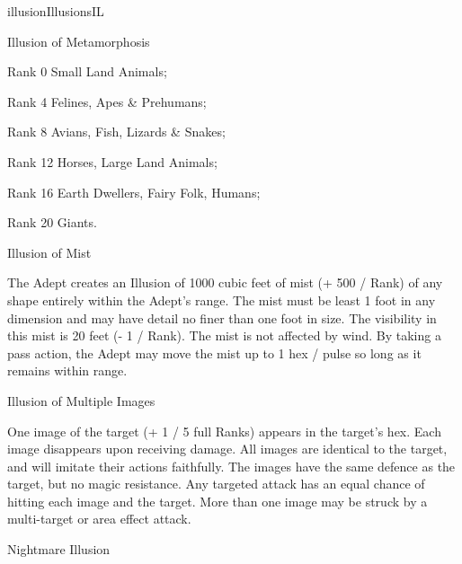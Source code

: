 \begin{college}[1.4]{illusion}{Illusions}{IL}
\begin{spell}[S-11]{Illusion of Metamorphosis}
\begin{effects}
\begin{Description}
\item[Rank 0] Small Land Animals;
\item[Rank 4] Felines, Apes \& Prehumans;
\item[Rank 8] Avians, Fish, Lizards \& Snakes;
\item[Rank 12] Horses, Large Land Animals;
\item[Rank 16] Earth Dwellers, Fairy Folk, Humans;
\item[Rank 20] Giants.
\end{Description}
\end{effects}
\end{spell}

\begin{spell}[S-12]{Illusion of Mist}

\begin{effects}
The Adept creates an Illusion of 1000 cubic feet of mist (+ 500 /
Rank) of any shape entirely within the Adept's range. The mist must be
least 1 foot in any dimension and may have detail no finer than one
foot in size. The visibility in this mist is 20 feet (- 1 / Rank). The
mist is not affected by wind. By taking a pass action, the Adept may
move the mist up to 1 hex / pulse so long as it remains within range.
\end{effects}
\end{spell}

\begin{spell}[S-13]{Illusion of Multiple Images}

\begin{effects}
One image of the target (+ 1 / 5 full Ranks) appears in the target's
hex. Each image disappears upon receiving damage. All images are
identical to the target, and will imitate their actions faithfully.
The images have the same defence as the target, but no magic
resistance. Any targeted attack has an equal chance of hitting each
image and the target. More than one image may be struck by a
multi-target or area effect attack.
\end{effects}
\end{spell}

\begin{spell}[S-14]{Nightmare Illusion}


\end{spell}
\end{college}
